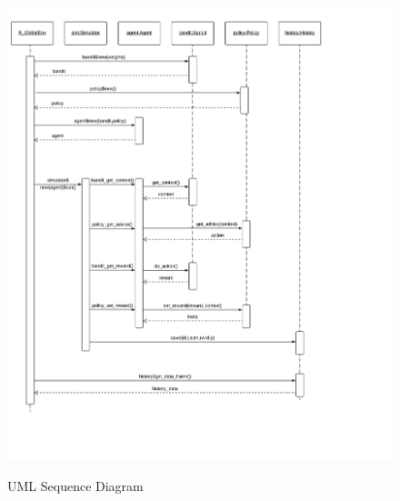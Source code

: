 \documentclass[nojss]{jss}\usepackage[]{graphicx}\usepackage[]{color}
\begin{document}
\begin{figure}[H]
  \centering
    \includegraphics[width=.99\textwidth]{fig/contextual_sequence}
    \label{fig:contextual_sequence}
      \caption{ UML Sequence Diagram}
\end{figure}
\end{document}
